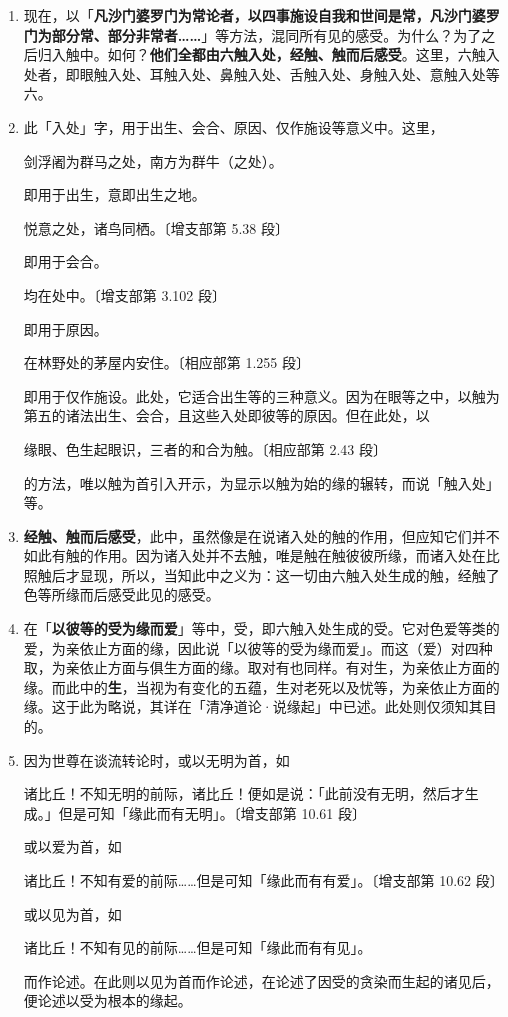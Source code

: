 \begin{enumerate}\item 现在，以「\textbf{凡沙门婆罗门为常论者，以四事施设自我和世间是常，凡沙门婆罗门为部分常、部分非常者……}」等方法，混同所有见的感受。为什么？为了之后归入触中。如何？\textbf{他们全都由六触入处，经触、触而后感受}。这里，六触入处者，即眼触入处、耳触入处、鼻触入处、舌触入处、身触入处、意触入处等六。
\item 此「入处」字，用于出生、会合、原因、仅作施设等意义中。这里，\begin{quoting}剑浮阇为群马之处，南方为群牛（之处）。\end{quoting}即用于出生，意即出生之地。\begin{quoting}悦意之处，诸鸟同栖。{\bluefootnotesize 〔增支部第 5.38 段〕}\end{quoting}即用于会合。\begin{quoting}均在处中。{\bluefootnotesize 〔增支部第 3.102 段〕}\end{quoting}即用于原因。\begin{quoting}在林野处的茅屋内安住。{\bluefootnotesize 〔相应部第 1.255 段〕}\end{quoting}即用于仅作施设。此处，它适合出生等的三种意义。因为在眼等之中，以触为第五的诸法出生、会合，且这些入处即彼等的原因。但在此处，以\begin{quoting}缘眼、色生起眼识，三者的和合为触。{\bluefootnotesize 〔相应部第 2.43 段〕}\end{quoting}的方法，唯以触为首引入开示，为显示以触为始的缘的辗转，而说「触入处」等。
\item \textbf{经触、触而后感受}，此中，虽然像是在说诸入处的触的作用，但应知它们并不如此有触的作用。因为诸入处并不去触，唯是触在触彼彼所缘，而诸入处在比照触后才显现，所以，当知此中之义为：这一切由六触入处生成的触，经触了色等所缘而后感受此见的感受。
\item 在「\textbf{以彼等的受为缘而爱}」等中，受，即六触入处生成的受。它对色爱等类的爱，为亲依止方面的缘，因此说「以彼等的受为缘而爱」。而这（爱）对四种取，为亲依止方面与俱生方面的缘。取对有也同样。有对生，为亲依止方面的缘。而此中的\textbf{生}，当视为有变化的五蕴，生对老死以及忧等，为亲依止方面的缘。这于此为略说，其详在「清净道论·说缘起」中已述。此处则仅须知其目的。
\item 因为世尊在谈流转论时，或以无明为首，如\begin{quoting}诸比丘！不知无明的前际，诸比丘！便如是说：「此前没有无明，然后才生成。」但是可知「缘此而有无明」。{\bluefootnotesize 〔增支部第 10.61 段〕}\end{quoting}或以爱为首，如\begin{quoting}诸比丘！不知有爱的前际……但是可知「缘此而有有爱」。{\bluefootnotesize 〔增支部第 10.62 段〕}\end{quoting}或以见为首，如\begin{quoting}诸比丘！不知有见的前际……但是可知「缘此而有有见」。\end{quoting}而作论述。在此则以见为首而作论述，在论述了因受的贪染而生起的诸见后，便论述以受为根本的缘起。

\end{enumerate}
